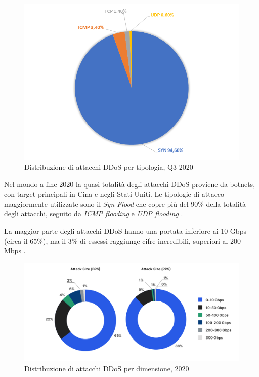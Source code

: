 \begin{figure}[h]
    \includegraphics[width=\hsize]{images/introduzione/tesi_distribuzione_tipologia_attacchi.png}
    \caption{Distribuzione di attacchi DDoS per tipologia, Q3 2020 \cite{ddos_kaspersky_q3_2020}}
    \centering
\end{figure}

Nel mondo a fine 2020 la quasi totalità degli attacchi DDoS proviene da botnets, con target principali in Cina e negli Stati Uniti. Le tipologie di attacco maggiormente utilizzate sono il \emph{Syn Flood} che copre più del 90\% della totalità degli attacchi, seguito da \emph{ICMP flooding} e \emph{UDP flooding} \cite{ddos_kaspersky, ddos_kaspersky_q3_2020}.


La maggior parte degli attacchi DDoS hanno una portata inferiore ai 10 Gbps (circa il 65\%), ma il 3\% di essessi raggiunge cifre incredibili, superiori al 200 Mbps \cite{imperva_ddos_report}.

\begin{figure}[h]
    \includegraphics[width=\hsize]{images/introduzione/attacks_size.png}
    \caption{Distribuzione di attacchi DDoS per dimensione, 2020 \cite{imperva_ddos_report}}
    \centering
\end{figure}



